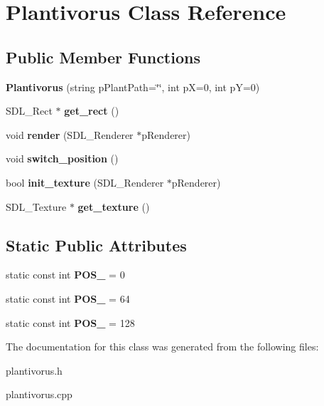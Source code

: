 \hypertarget{classPlantivorus}{}\section{Plantivorus Class Reference}
\label{classPlantivorus}
\subsection*{Public Member Functions}
\begin{DoxyCompactItemize}
\item 
\mbox{\label{classPlantivorus_a8a5caa299c06b3626a8d6fe2e53c0a54}} 
{\bfseries Plantivorus} (string p\+Plant\+Path=\char`\"{}\char`\"{}, int pX=0, int pY=0)
\item 
\mbox{\label{classPlantivorus_a6d485c6385cd5a96114dea6f0ac5c96b}} 
S\+D\+L\+\_\+\+Rect $\ast$ {\bfseries get\+\_\+rect} ()
\item 
\mbox{\label{classPlantivorus_a5f32ef2d9a187efd32351c257e311011}} 
void {\bfseries render} (S\+D\+L\+\_\+\+Renderer $\ast$p\+Renderer)
\item 
\mbox{\label{classPlantivorus_ae08881dd702f9dc1442679cea8f48d10}} 
void {\bfseries switch\+\_\+position} ()
\item 
\mbox{\label{classPlantivorus_a5e7fcc83b857dee24285bdb9d3d9a129}} 
bool {\bfseries init\+\_\+texture} (S\+D\+L\+\_\+\+Renderer $\ast$p\+Renderer)
\item 
\mbox{\label{classPlantivorus_a8438a97a67f14980392b4a729c71d895}} 
S\+D\+L\+\_\+\+Texture $\ast$ {\bfseries get\+\_\+texture} ()
\end{DoxyCompactItemize}
\subsection*{Static Public Attributes}
\begin{DoxyCompactItemize}
\item 
\mbox{\label{classPlantivorus_a1d13b74939943d1d1cb40008895d28fe}} 
static const int {\bfseries P\+O\+S\+\_} = 0
\item 
\mbox{\label{classPlantivorus_a130f00b8d19dbd827dd1d5a5bdde400e}} 
static const int {\bfseries P\+O\+S\+\_} = 64
\item 
\mbox{\label{classPlantivorus_a8a50b0c3e394c40706dd26276d225221}} 
static const int {\bfseries P\+O\+S\+\_} = 128
\end{DoxyCompactItemize}


The documentation for this class was generated from the following files\+:\begin{DoxyCompactItemize}
\item 
plantivorus.\+h\item 
plantivorus.\+cpp\end{DoxyCompactItemize}
